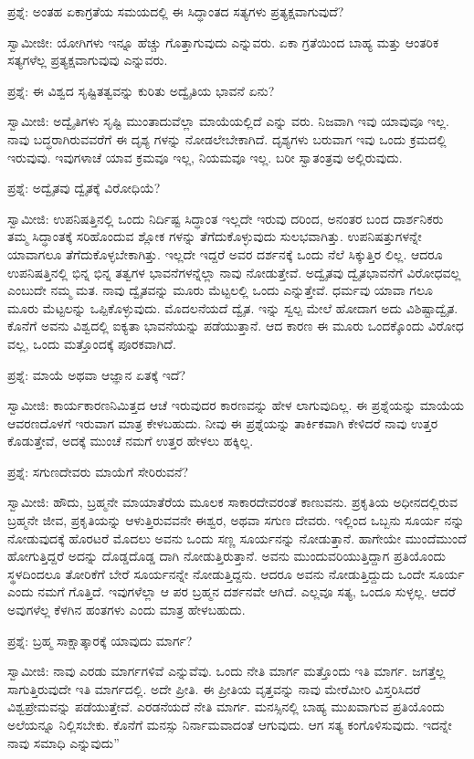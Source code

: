 ಪ್ರಶ್ನೆ: ಅಂತಹ ಏಕಾಗ್ರತೆಯ ಸಮಯದಲ್ಲಿ ಈ ಸಿದ್ಧಾಂತದ ಸತ್ಯಗಳು ಪ್ರತ್ಯಕ್ಷವಾಗುವುದೆ?

ಸ್ವಾಮೀಜೀ: ಯೋಗಿಗಳು ಇನ್ನೂ ಹೆಚ್ಚು ಗೊತ್ತಾಗುವುದು ಎನ್ನುವರು. ಏಕಾ ಗ್ರತೆಯಿಂದ ಬಾಹ್ಯ ಮತ್ತು ಆಂತರಿಕ ಸತ್ಯಗಳೆಲ್ಲ ಪ್ರತ್ಯಕ್ಷವಾಗುವುವು ಎನ್ನುವರು.

ಪ್ರಶ್ನೆ: ಈ ವಿಶ್ವದ ಸೃಷ್ಟಿತತ್ವವನ್ನು ಕುರಿತು ಅದ್ವೈತಿಯ ಭಾವನೆ ಏನು?

ಸ್ವಾಮೀಜಿ: ಅದ್ವೈತಿಗಳು ಸೃಷ್ಟಿ ಮುಂತಾದುವೆಲ್ಲಾ ಮಾಯೆಯಲ್ಲಿದೆ ಎನ್ನು ವರು. ನಿಜವಾಗಿ ಇವು ಯಾವುವೂ ಇಲ್ಲ. ನಾವು ಬದ್ಧರಾಗಿರುವವರೆಗೆ ಈ ದೃಶ್ಯ ಗಳನ್ನು ನೋಡಲೇಬೇಕಾಗಿದೆ. ದೃಶ್ಯಗಳು ಬರುವಾಗ ಇವು ಒಂದು ಕ್ರಮದಲ್ಲಿ ಇರುವುವು. ಇವುಗಳಾಚೆ ಯಾವ ಕ್ರಮವೂ ಇಲ್ಲ, ನಿಯಮವೂ ಇಲ್ಲ. ಬರೀ ಸ್ವಾತಂತ್ರವು ಅಲ್ಲಿರುವುದು.

ಪ್ರಶ್ನೆ: ಅದ್ವೈತವು ದ್ವೈತಕ್ಕೆ ವಿರೋಧಿಯೆ?

ಸ್ವಾಮೀಜಿ: ಉಪನಿಷತ್ತಿನಲ್ಲಿ ಒಂದು ನಿರ್ದಿಷ್ಟ ಸಿದ್ಧಾಂತ ಇಲ್ಲದೇ ಇರುವು ದರಿಂದ, ಅನಂತರ ಬಂದ ದಾರ್ಶನಿಕರು ತಮ್ಮ ಸಿದ್ಧಾಂತಕ್ಕೆ ಸರಿಹೊಂದುವ ಶ್ಲೋಕ ಗಳನ್ನು ತೆಗೆದುಕೊಳ್ಳುವುದು ಸುಲಭವಾಗಿತ್ತು. ಉಪನಿಷತ್ತುಗಳನ್ನೇ ಯಾವಾಗಲೂ ತೆಗೆದುಕೊಳ್ಳಬೇಕಾಗಿತ್ತು. ಇಲ್ಲದೇ ಇದ್ದರೆ ಅವರ ದರ್ಶನಕ್ಕೆ ಒಂದು ನೆಲೆ ಸಿಕ್ಕುತ್ತಿರ ಲಿಲ್ಲ. ಆದರೂ ಉಪನಿಷತ್ತಿನಲ್ಲಿ ಭಿನ್ನ ಭಿನ್ನ ತತ್ವಗಳ ಭಾವನೆಗಳನ್ನೆಲ್ಲಾ ನಾವು ನೋಡುತ್ತೇವೆ. ಅದ್ವೈತವು ದ್ವೈತಭಾವನೆಗೆ ವಿರೋಧವಲ್ಲ ಎಂಬುದೇ ನಮ್ಮ ಮತ. ನಾವು ದ್ವೈತವನ್ನು ಮೂರು ಮೆಟ್ಟಲಲ್ಲಿ ಒಂದು ಎನ್ನುತ್ತೇವೆ. ಧರ್ಮವು ಯಾವಾ ಗಲೂ ಮೂರು ಮೆಟ್ಟಲನ್ನು ಒಪ್ಪಿಕೊಳ್ಳುವುದು. ಮೊದಲನೆಯದೆ ದ್ವೈತ. ಇನ್ನು ಸ್ವಲ್ಪ ಮೇಲೆ ಹೋದಾಗ ಅದು ವಿಶಿಷ್ಟಾದ್ವೈತ. ಕೊನೆಗೆ ಅವನು ವಿಶ್ವದಲ್ಲಿ ಐಕ್ಯತಾ ಭಾವನೆಯನ್ನು ಪಡೆಯುತ್ತಾನೆ. ಆದ ಕಾರಣ ಈ ಮೂರು ಒಂದಕ್ಕೊಂದು ವಿರೋಧ ವಲ್ಲ, ಒಂದು ಮತ್ತೊಂದಕ್ಕೆ ಪೂರಕವಾಗಿದೆ.

ಪ್ರಶ್ನೆ: ಮಾಯೆ ಅಥವಾ ಆಜ್ಞಾನ ಏತಕ್ಕೆ ಇದೆ?

ಸ್ವಾಮೀಜಿ: ಕಾರ್ಯಕಾರಣನಿಮಿತ್ತದ ಆಚೆ ಇರುವುದರ ಕಾರಣವನ್ನು ಹೇಳ ಲಾಗುವುದಿಲ್ಲ. ಈ ಪ್ರಶ್ನೆಯನ್ನು ಮಾಯೆಯ ಆವರಣದೊಳಗೆ ಇರುವಾಗ ಮಾತ್ರ ಕೇಳಬಹುದು. ನೀವು ಈ ಪ್ರಶ್ನೆಯನ್ನು ತಾರ್ಕಿಕವಾಗಿ ಕೇಳಿದರೆ ನಾವು ಉತ್ತರ ಕೊಡುತ್ತೇವೆ, ಅದಕ್ಕೆ ಮುಂಚೆ ನಮಗೆ ಉತ್ತರ ಹೇಳಲು ಹಕ್ಕಿಲ್ಲ.

ಪ್ರಶ್ನೆ: ಸಗುಣದೇವರು ಮಾಯೆಗೆ ಸೇರಿರುವನೆ?

ಸ್ವಾಮೀಜಿ: ಹೌದು, ಬ್ರಹ್ಮನೇ ಮಾಯಾತೆರೆಯ ಮೂಲಕ ಸಾಕಾರದೇವರಂತೆ ಕಾಣುವನು. ಪ್ರಕೃತಿಯ ಅಧೀನದಲ್ಲಿರುವ ಬ್ರಹ್ಮನೇ ಜೀವ, ಪ್ರಕೃತಿಯನ್ನು ಆಳುತ್ತಿರುವವನೇ ಈಶ್ವರ, ಅಥವಾ ಸಗುಣ ದೇವರು. ಇಲ್ಲಿಂದ ಒಬ್ಬನು ಸೂರ್ಯ ನನ್ನು ನೋಡುವುದಕ್ಕೆ ಹೊರಟರೆ ಮೊದಲು ಅವನು ಒಂದು ಸಣ್ಣ ಸೂರ್ಯನನ್ನು ನೋಡುತ್ತಾನೆ. ಹಾಗೇಯೇ ಮುಂದೆಮುಂದೆ ಹೋಗುತ್ತಿದ್ದರೆ ಅದನ್ನು ದೊಡ್ಡದೊಡ್ಡ ದಾಗಿ ನೋಡುತ್ತಿರುತ್ತಾನೆ. ಅವನು ಮುಂದುವರಿಯುತ್ತಿದ್ದಾಗ ಪ್ರತಿಯೊಂದು ಸ್ಥಳದಿಂದಲೂ ತೋರಿಕೆಗೆ ಬೇರೆ ಸೂರ್ಯನನ್ನೇ ನೋಡುತ್ತಿದ್ದನು. ಆದರೂ ಅವನು ನೋಡುತ್ತಿದ್ದುದು ಒಂದೇ ಸೂರ್ಯ ಎಂದು ನಮಗೆ ಗೊತ್ತಿದೆ. ಇವುಗಳೆಲ್ಲಾ ಆ ಪರ ಬ್ರಹ್ಮನ ದರ್ಶನವೇ ಆಗಿದೆ. ಎಲ್ಲವೂ ಸತ್ಯ, ಒಂದೂ ಸುಳ್ಳಲ್ಲ. ಆದರೆ ಅವುಗಳೆಲ್ಲ ಕೆಳಗಿನ ಹಂತಗಳು ಎಂದು ಮಾತ್ರ ಹೇಳಬಹುದು.

ಪ್ರಶ್ನೆ: ಬ್ರಹ್ಮ ಸಾಕ್ಷಾತ್ಕಾರಕ್ಕೆ ಯಾವುದು ಮಾರ್ಗ?

ಸ್ವಾಮೀಜಿ: ನಾವು ಎರಡು ಮಾರ್ಗಗಳಿವೆ ಎನ್ನುವೆವು. ಒಂದು ನೇತಿ ಮಾರ್ಗ ಮತ್ತೊಂದು ಇತಿ ಮಾರ್ಗ. ಜಗತ್ತೆಲ್ಲ ಸಾಗುತ್ತಿರುವುದೇ ಇತಿ ಮಾರ್ಗದಲ್ಲಿ. ಅದೇ ಪ್ರೀತಿ. ಈ ಪ್ರೀತಿಯ ವೃತ್ತವನ್ನು ನಾವು ಮೇರೆಮೀರಿ ವಿಸ್ತರಿಸಿದರೆ ವಿಶ್ವಪ್ರೇಮವನ್ನು ಪಡೆಯುತ್ತೇವೆ. ಎರಡನೆಯದೆ ನೇತಿ ಮಾರ್ಗ. ಮನಸ್ಸಿನಲ್ಲಿ ಬಾಹ್ಯ ಮುಖವಾಗುವ ಪ್ರತಿಯೊಂದು ಅಲೆಯನ್ನೂ ನಿಲ್ಲಿಸಬೇಕು. ಕೊನೆಗೆ ಮನಸ್ಸು ನಿರ್ನಾಮವಾದಂತೆ ಆಗುವುದು. ಆಗ ಸತ್ಯ ಕಂಗೊಳಿಸುವುದು. ಇದನ್ನೇ ನಾವು ಸಮಾಧಿ ಎನ್ನುವುದು”

